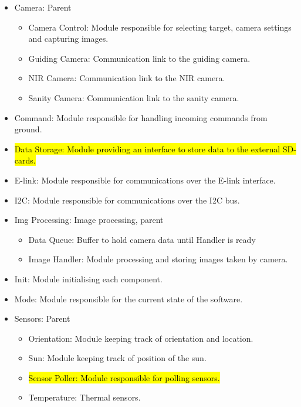 \begin{itemize}

	\item Camera: Parent
		\begin{itemize}
			\item Camera Control: Module responsible for selecting target, camera settings and capturing images.
			\item Guiding Camera: Communication link to the guiding camera.
			\item NIR Camera: Communication link to the NIR camera.
			\item Sanity Camera: Communication link to the sanity camera.
		\end{itemize}

	\item Command: Module responsible for handling incoming commands from ground.

	\item \hl{Data Storage: Module providing an interface to store data to the external SD-cards.}

	\item E-link: Module responsible for communications over the E-link interface.

	\item I2C: Module responsible for communications over the I2C bus.

	\item Img Processing: Image processing, parent
		\begin{itemize}
			\item Data Queue: Buffer to hold camera data until Handler is ready
			\item Image Handler: Module processing and storing images taken by camera.
		\end{itemize}

	\item Init: Module initialising each component.

	\item Mode: Module responsible for the current state of the software.

	\item Sensors: Parent
		\begin{itemize}
			\item Orientation: Module keeping track of orientation and location.
			\item Sun: Module keeping track of position of the sun.
			\item \hl{Sensor Poller: Module responsible for polling sensors.}
			\item Temperature: Thermal sensors.
		\end{itemize}


\end{itemize}
